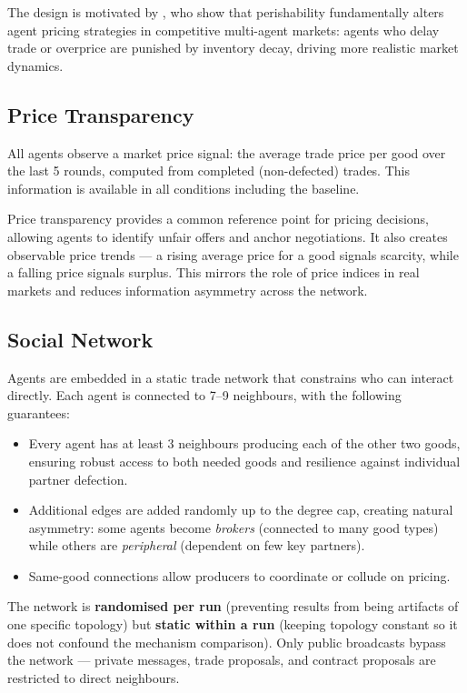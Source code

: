 \documentclass[12pt, a4paper]{article}
\begin{document}
The design is motivated by \citet{chen2018perishable}, who show that perishability fundamentally alters agent pricing strategies in competitive multi-agent markets: agents who delay trade or overprice are punished by inventory decay, driving more realistic market dynamics.

\subsection{Price Transparency}

All agents observe a market price signal: the average trade price per good over the last 5 rounds, computed from completed (non-defected) trades. This information is available in all conditions including the baseline.

Price transparency provides a common reference point for pricing decisions, allowing agents to identify unfair offers and anchor negotiations. It also creates observable price trends — a rising average price for a good signals scarcity, while a falling price signals surplus. This mirrors the role of price indices in real markets and reduces information asymmetry across the network.

\subsection{Social Network}

Agents are embedded in a static trade network that constrains who can interact directly. Each agent is connected to 7--9 neighbours, with the following guarantees:

\begin{itemize}
  \item Every agent has at least 3 neighbours producing each of the other two goods, ensuring robust access to both needed goods and resilience against individual partner defection.
  \item Additional edges are added randomly up to the degree cap, creating natural asymmetry: some agents become \textit{brokers} (connected to many good types) while others are \textit{peripheral} (dependent on few key partners).
  \item Same-good connections allow producers to coordinate or collude on pricing.
\end{itemize}

The network is \textbf{randomised per run} (preventing results from being artifacts of one specific topology) but \textbf{static within a run} (keeping topology constant so it does not confound the mechanism comparison). Only public broadcasts bypass the network — private messages, trade proposals, and contract proposals are restricted to direct neighbours.
\end{document}
